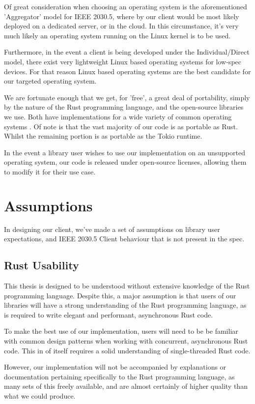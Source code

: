 Of great consideration when choosing an operating system is the aforementioned 'Aggregator' model for IEEE 2030.5, where by our client would be most likely deployed on a dedicated server, or in the cloud. In this circumstance, it's very much likely an operating system running on the Linux kernel is to be used.

Furthermore, in the event a client is being developed under the Individual/Direct model, there exist very lightweight Linux based operating systems for low-spec devices. For that reason Linux based operating systems are the best candidate for our targeted operating system.

We are fortunate enough that we get, for 'free', a great deal of portability, simply by the nature of the Rust programming language, and the open-source libraries we use. Both have implementations for a wide variety of common operating systems \cite{RustPlatforms} \cite{TokioDocs}. Of note is that the vast majority of our code is as portable as Rust. Whilst the remaining portion is as portable as the Tokio runtime.

In the event a library user wishes to use our implementation on an unsupported operating system, our code is released under open-source licenses, allowing them to modify it for their use case.
    
\section{Assumptions}
In designing our client, we've made a set of assumptions on library user expectations, and IEEE 2030.5 Client behaviour that is not present in the spec.

\subsection{Rust Usability}
This thesis is designed to be understood without extensive knowledge of the Rust programming language.
Despite this, a major assumption is that users of our libraries will have a strong understanding of the Rust programming language, as is required to write elegant and performant, asynchronous Rust code.

To make the best use of our implementation, users will need to be be familiar with common design patterns when working with concurrent, asynchronous Rust code. This in of itself requires a solid understanding of single-threaded Rust code.

However, our implementation will not be accompanied by explanations or documentation pertaining specifically to the Rust programming language, as many sets of this freely available, and are almost certainly of higher quality than what we could produce. 

